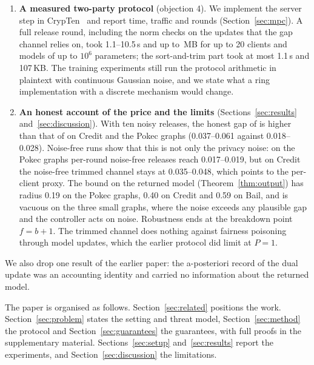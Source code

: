 \begin{enumerate}
\item \textbf{A measured two-party protocol} (objection 4). We implement the server step in CrypTen~\citep{knott2021crypten} and report time, traffic and rounds (Section~\ref{sec:mpc}). A full release round, including the norm checks on the updates that the gap channel relies on, took 1.1--10.5\,s and up to \mpcFullMB\,MB for up to 20 clients and models of up to $10^6$ parameters; the sort-and-trim part took at most 1.1\,s and 107\,KB. The training experiments still run the protocol arithmetic in plaintext with continuous Gaussian noise, and we state what a ring implementation with a discrete mechanism would change.
\item \textbf{An honest account of the price and the limits} (Sections~\ref{sec:results} and~\ref{sec:discussion}). With ten noisy releases, the honest gap of \rt{} is higher than that of \clamp{} on Credit and the Pokec graphs (0.037--0.061 against 0.018--0.028). Noise-free runs show that this is not only the privacy noise: on the Pokec graphs per-round noise-free releases reach 0.017--0.019, but on Credit the noise-free trimmed channel stays at 0.035--0.048, which points to the per-client proxy. The bound on the returned model (Theorem~\ref{thm:output}) has radius 0.19 on the Pokec graphs, 0.40 on Credit and 0.59 on Bail, and is vacuous on the three small graphs, where the noise exceeds any plausible gap and the controller acts on noise. Robustness ends at the breakdown point $f=b+1$. The trimmed channel does nothing against fairness poisoning through model updates, which the earlier protocol did limit at $P=1$.
\end{enumerate}
We also drop one result of the earlier paper: the a-posteriori record of the dual update was an accounting identity and carried no information about the returned model.

The paper is organised as follows. Section~\ref{sec:related} positions the work. Section~\ref{sec:problem} states the setting and threat model, Section~\ref{sec:method} the protocol and Section~\ref{sec:guarantees} the guarantees, with full proofs in the supplementary material. Sections~\ref{sec:setup} and~\ref{sec:results} report the experiments, and Section~\ref{sec:discussion} the limitations.
